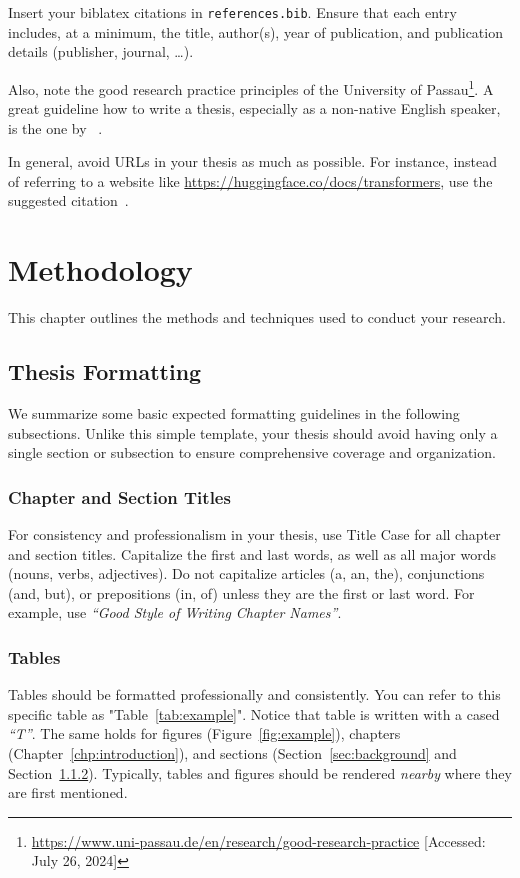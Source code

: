 \documentclass[a4paper,12pt,notitlepage,twoside,openright]{report}
\begin{document}
Insert your biblatex citations in \texttt{references.bib}. Ensure that each entry includes, at a minimum, the title, author(s), year of publication, and publication details (publisher, journal, \dots).

Also, note the good research practice principles of the University of Passau\footnote{\url{https://www.uni-passau.de/en/research/good-research-practice} [Accessed: July 26, 2024]}. A great guideline how to write a thesis, especially as a non-native English speaker, is the one by \citeauthor{GlasmanDeal2009ScienceRW}~\cite{GlasmanDeal2009ScienceRW}.

In general, avoid URLs in your thesis as much as possible. For instance, instead of referring to a website like \url{https://huggingface.co/docs/transformers}, use the suggested citation~\cite{transformers}.


\chapter{Methodology}
This chapter outlines the methods and techniques used to conduct your research.

\section{Thesis Formatting}
We summarize some basic expected formatting guidelines in the following subsections. Unlike this simple template, your thesis should avoid having only a single section or subsection to ensure comprehensive coverage and organization.

\subsection{Chapter and Section Titles}

For consistency and professionalism in your thesis, use Title Case for all chapter and section titles. Capitalize the first and last words, as well as all major words (nouns, verbs, adjectives). Do not capitalize articles (a, an, the), conjunctions (and, but), or prepositions (in, of) unless they are the first or last word. For example, use \emph{“Good Style of Writing Chapter Names”}.

\subsection{Tables}\label{subsec:tables}

Tables should be formatted professionally and consistently. You can refer to this specific table as "Table~\ref{tab:example}". Notice that table is written with a cased \emph{“T”}. The same holds for figures (Figure~\ref{fig:example}), chapters (Chapter~\ref{chp:introduction}), and sections (Section~\ref{sec:background} and Section~\ref{subsec:tables}). Typically, tables and figures should be rendered \emph{nearby} where they are first mentioned.  
\end{document}
